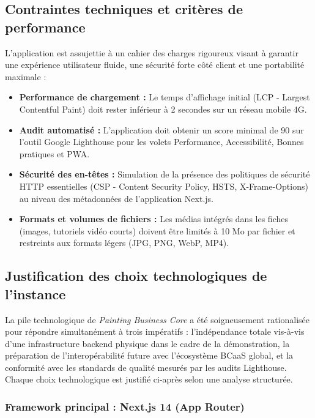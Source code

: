 \documentclass[12pt,a4paper]{report}
\begin{document}
\subsection{Contraintes techniques et critères de performance}

L'application est assujettie à un cahier des charges rigoureux visant à garantir une expérience utilisateur fluide, une sécurité forte côté client et une portabilité maximale :

\begin{itemize}
    \item \textbf{Performance de chargement :} Le temps d'affichage initial (LCP - Largest Contentful Paint) doit rester inférieur à 2 secondes sur un réseau mobile 4G.
    \item \textbf{Audit automatisé :} L'application doit obtenir un score minimal de 90 sur l'outil Google Lighthouse pour les volets Performance, Accessibilité, Bonnes pratiques et PWA.
    \item \textbf{Sécurité des en-têtes :} Simulation de la présence des politiques de sécurité HTTP essentielles (CSP - Content Security Policy, HSTS, X-Frame-Options) au niveau des métadonnées de l'application Next.js.
    \item \textbf{Formats et volumes de fichiers :} Les médias intégrés dans les fiches (images, tutoriels vidéo courts) doivent être limités à 10 Mo par fichier et restreints aux formats légers (JPG, PNG, WebP, MP4).
\end{itemize}

\subsection{Justification des choix technologiques de l'instance}

\noindent
La pile technologique de \textit{Painting Business Core} a été soigneusement rationalisée pour répondre simultanément à trois impératifs : l'indépendance totale vis-à-vis d'une infrastructure backend physique dans le cadre de la démonstration, la préparation de l'interopérabilité future avec l'écosystème BCaaS global, et la conformité avec les standards de qualité mesurés par les audits Lighthouse. Chaque choix technologique est justifié ci-après selon une analyse structurée.

\subsubsection*{Framework principal : Next.js 14 (App Router)}
\end{document}
